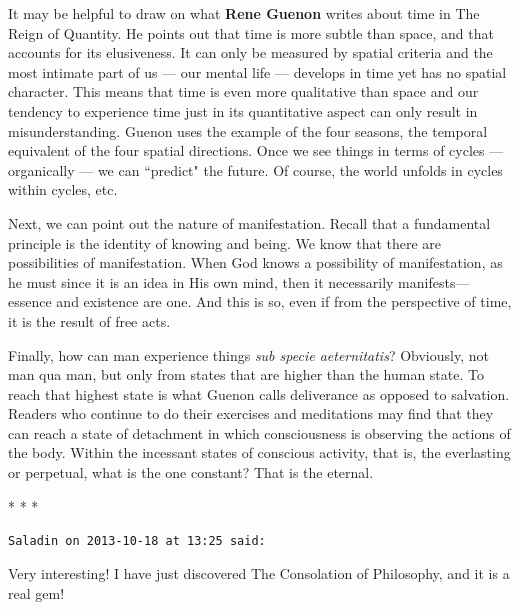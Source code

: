 It may be helpful to draw on what \textbf{Rene Guenon} writes about time in The Reign of Quantity. He points out that time is more subtle than space, and that accounts for its elusiveness. It can only be measured by spatial criteria and the most intimate part of us — our mental life — develops in time yet has no spatial character. This means that time is even more qualitative than space and our tendency to experience time just in its quantitative aspect can only result in misunderstanding. Guenon uses the example of the four seasons, the temporal equivalent of the four spatial directions. Once we see things in terms of cycles — organically — we can ``predict" the future. Of course, the world unfolds in cycles within cycles, etc.

Next, we can point out the nature of manifestation. Recall that a fundamental principle is the identity of knowing and being. We know that there are possibilities of manifestation. When God knows a possibility of manifestation, as he must since it is an idea in His own mind, then it necessarily manifests—essence and existence are one. And this is so, even if from the perspective of time, it is the result of free acts.

Finally, how can man experience things \emph{sub specie aeternitatis}? Obviously, not man qua man, but only from states that are higher than the human state. To reach that highest state is what Guenon calls deliverance as opposed to salvation. Readers who continue to do their exercises and meditations may find that they can reach a state of detachment in which consciousness is observing the actions of the body. Within the incessant states of conscious activity, that is, the everlasting or perpetual, what is the one constant? That is the eternal.




\begin{center}* * *\end{center}

\begin{footnotesize}\begin{sffamily}



\texttt{Saladin on 2013-10-18 at 13:25 said: }

Very interesting! I have just discovered The Consolation of Philosophy, and it is a real gem!


\end{sffamily}\end{footnotesize}
